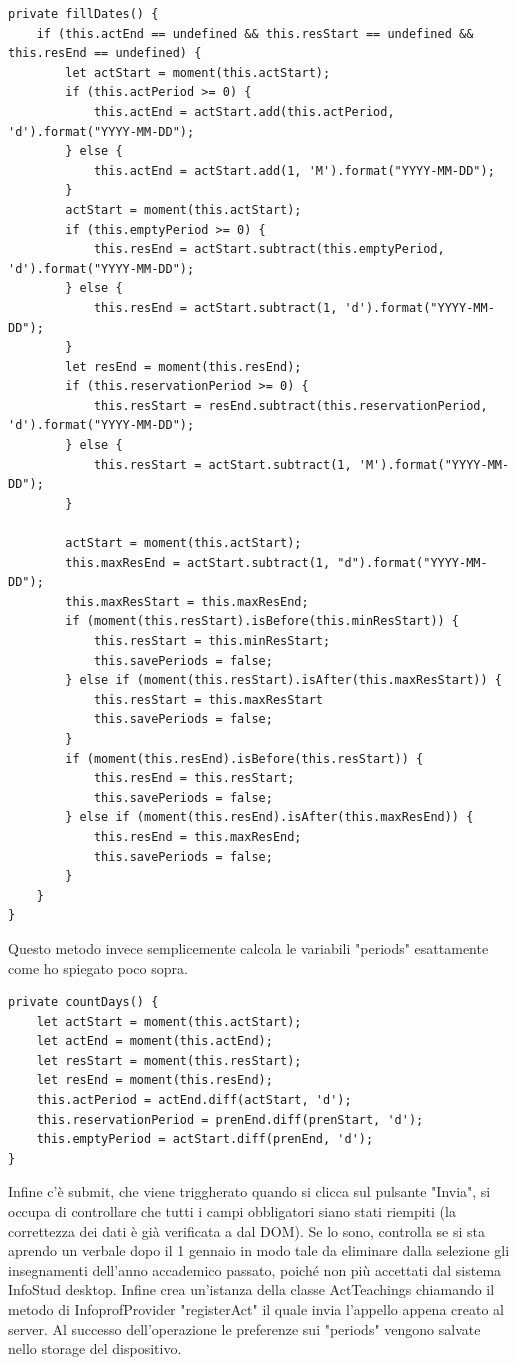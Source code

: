 \documentclass[Lau, oneside, noexaminfo]{sapthesis}%
\begin{document}
\begin{lstlisting}[frame=single]
private fillDates() {
	if (this.actEnd == undefined && this.resStart == undefined && this.resEnd == undefined) {
		let actStart = moment(this.actStart);
		if (this.actPeriod >= 0) {
			this.actEnd = actStart.add(this.actPeriod, 'd').format("YYYY-MM-DD");
		} else {
			this.actEnd = actStart.add(1, 'M').format("YYYY-MM-DD");
		}
		actStart = moment(this.actStart);
		if (this.emptyPeriod >= 0) {
			this.resEnd = actStart.subtract(this.emptyPeriod, 'd').format("YYYY-MM-DD");
		} else {
			this.resEnd = actStart.subtract(1, 'd').format("YYYY-MM-DD");
		}
		let resEnd = moment(this.resEnd);
		if (this.reservationPeriod >= 0) {
			this.resStart = resEnd.subtract(this.reservationPeriod, 'd').format("YYYY-MM-DD");
		} else {
			this.resStart = actStart.subtract(1, 'M').format("YYYY-MM-DD");
		}

		actStart = moment(this.actStart);
		this.maxResEnd = actStart.subtract(1, "d").format("YYYY-MM-DD");
		this.maxResStart = this.maxResEnd;
		if (moment(this.resStart).isBefore(this.minResStart)) {
			this.resStart = this.minResStart;
			this.savePeriods = false;
		} else if (moment(this.resStart).isAfter(this.maxResStart)) {
			this.resStart = this.maxResStart
			this.savePeriods = false;
		}
		if (moment(this.resEnd).isBefore(this.resStart)) {
			this.resEnd = this.resStart;
			this.savePeriods = false;
		} else if (moment(this.resEnd).isAfter(this.maxResEnd)) {
			this.resEnd = this.maxResEnd;
			this.savePeriods = false;
		}
	}
}
\end{lstlisting}

Questo metodo invece semplicemente calcola le variabili "periods" esattamente come ho spiegato poco sopra.

\begin{lstlisting}
private countDays() {
	let actStart = moment(this.actStart);
	let actEnd = moment(this.actEnd);
	let resStart = moment(this.resStart);
	let resEnd = moment(this.resEnd);
	this.actPeriod = actEnd.diff(actStart, 'd');
	this.reservationPeriod = prenEnd.diff(prenStart, 'd');
	this.emptyPeriod = actStart.diff(prenEnd, 'd');
}
\end{lstlisting}

Infine c'è submit, che viene triggherato quando si clicca sul pulsante "Invia", si occupa di controllare che tutti i campi obbligatori siano stati riempiti (la correttezza dei dati è già verificata a dal DOM). Se lo sono, controlla se si sta aprendo un verbale dopo il 1 gennaio in modo tale da eliminare dalla selezione gli insegnamenti dell'anno accademico passato, poiché non più accettati dal sistema InfoStud desktop. Infine crea un'istanza della classe ActTeachings chiamando il metodo di InfoprofProvider "registerAct" il quale invia l'appello appena creato al server. Al successo dell'operazione le preferenze sui "periods" vengono salvate nello storage del dispositivo.
\end{document}
